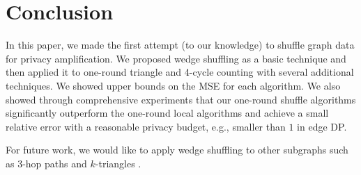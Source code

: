 \documentclass[sigconf]{acmart}
\begin{document}


\maketitle







% 


\section{Conclusion}
\label{chap3-sec:conclusion}
In this paper, we made the first attempt (to our knowledge) to 
shuffle graph data for privacy amplification. 
We proposed wedge shuffling as a basic technique and then applied it to 
one-round triangle and 4-cycle counting with several additional techniques. 
We showed upper bounds on 
the MSE 
for each algorithm. 
We also showed through comprehensive experiments that our one-round shuffle algorithms significantly outperform the one-round local algorithms and achieve a small relative error with a reasonable privacy budget, e.g., smaller than $1$ in edge DP. 

For future work, we would like to apply wedge shuffling to other subgraphs such as 3-hop paths \cite{Sun_CCS19} and $k$-triangles \cite{Karwa_PVLDB11}. 
\end{document}
